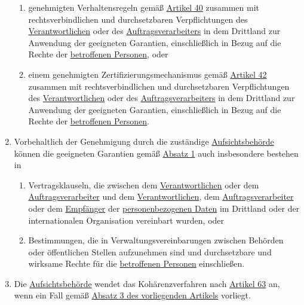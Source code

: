 \begin{enumerate}
\begin{enumerate}
    \item genehmigten Verhaltensregeln gemäß \hyperref[ch:40]{Artikel 40} zusammen mit rechtsverbindlichen und
     durchsetzbaren Verpflichtungen des \hyperref[itm:04-7]{Verantwortlichen} oder des \hyperref[itm:04-8]
     {Auftragsverarbeiters} in dem Drittland zur Anwendung der geeigneten Garantien, einschließlich in Bezug auf die
     Rechte der \hyperref[itm:04-1]{betroffenen Personen}, oder%
    \label{itm:46-2e}

    \item einem genehmigten Zertifizierungsmechanismus gemäß \hyperref[ch:42]{Artikel 42} zusammen mit
     rechtsverbindlichen und durchsetzbaren Verpflichtungen des \hyperref[itm:04-7]{Verantwortlichen} oder
     des \hyperref[itm:04-8]{Auftragsverarbeiters} in dem Drittland zur Anwendung der geeigneten Garantien,
     einschließlich in Bezug auf die Rechte der \hyperref[itm:04-1]{betroffenen Personen}.%
    \label{itm:46-2f}

  \end{enumerate}

  \item Vorbehaltlich der Genehmigung durch die zuständige \hyperref[itm:04-21]{Aufsichtsbehörde} können die geeigneten
   Garantien gemäß
   \hyperref[itm:46-1]{Absatz 1} auch insbesondere bestehen in%
  \label{itm:46-3}

  \begin{enumerate}
  
    \item Vertragsklauseln, die zwischen dem \hyperref[itm:04-7]{Verantwortlichen} oder dem \hyperref[itm:04-8]
     {Auftragsverarbeiter} und dem \hyperref[itm:04-7]{Verantwortlichen}, dem
     \hyperref[itm:04-8]{Auftragsverarbeiter} oder dem \hyperref[itm:04-9]{Empfänger} der \hyperref[itm:04-1]
      {personenbezogenen Daten} im Drittland oder der internationalen Organisation vereinbart wurden, oder%
    \label{itm:46-3a}

    \item Bestimmungen, die in Verwaltungsvereinbarungen zwischen Behörden oder öffentlichen Stellen aufzunehmen sind
     und durchsetzbare und wirksame Rechte für die \hyperref[itm:04-1]{betroffenen Personen} einschließen.%
    \label{itm:46-3b}

  \end{enumerate}

  \item Die \hyperref[itm:04-21]{Aufsichtsbehörde} wendet das Kohärenzverfahren nach \hyperref[ch:63]{Artikel 63} an,
   wenn ein Fall gemäß
   \hyperref[itm:46-3]{Absatz 3 des vorliegenden Artikels} vorliegt.%
  \label{itm:46-4}


\end{enumerate}

